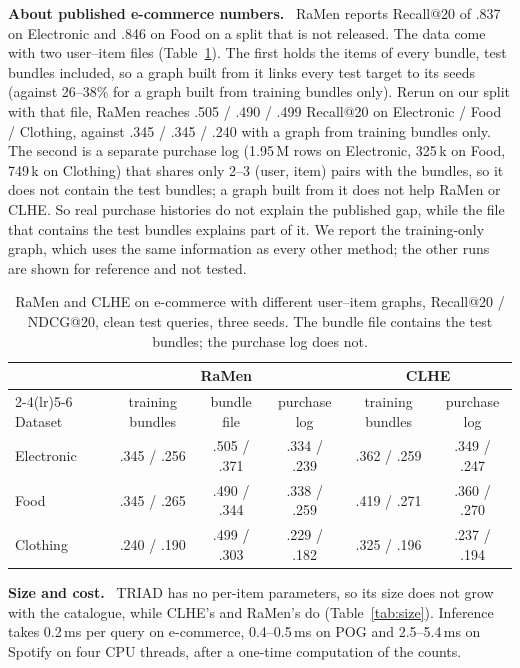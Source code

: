 \documentclass[runningheads]{llncs}
\renewcommand{\paragraph}[1]{\smallskip\noindent\textbf{#1}\ }
\begin{document}
\paragraph{About published e-commerce numbers.} RaMen reports Recall@20 of .837 on Electronic and .846 on Food
\cite{ramen} on a split that is not released. The data come with two user--item files (Table~\ref{tab:uigraph}).
The first holds the items of every bundle, test bundles included, so a graph built from it links every
test target to its seeds (against 26--38\% for a graph built from training bundles only). Rerun on our split with
that file, RaMen reaches .505 / .490 / .499 Recall@20 on Electronic / Food / Clothing, against .345 / .345 / .240
with a graph from training bundles only. The second is a separate purchase log (1.95\,M rows
on Electronic, 325\,k on Food, 749\,k on Clothing) that shares only 2--3 (user, item) pairs with the bundles, so it
does not contain the test bundles; a graph built from it does not help RaMen or CLHE. So real purchase histories do
not explain the published gap, while the file that contains the test bundles explains part of it. We report the training-only graph, which uses
the same information as every other method; the other runs are shown for reference and not tested.

\begin{table}[t]
\centering
\caption{RaMen and CLHE on e-commerce with different user--item graphs, Recall@20 / NDCG@20, clean test queries,
three seeds. The bundle file contains the test bundles; the purchase log does not.}
\label{tab:uigraph}
\setlength{\tabcolsep}{3pt}
\scriptsize
\begin{tabular}{lccccc}
\toprule
& \multicolumn{3}{c}{RaMen} & \multicolumn{2}{c}{CLHE}\\
\cmidrule(lr){2-4}\cmidrule(lr){5-6}
Dataset & training bundles & bundle file & purchase log & training bundles & purchase log\\
\midrule
Electronic & .345 / .256 & .505 / .371 & .334 / .239 & .362 / .259 & .349 / .247\\
Food & .345 / .265 & .490 / .344 & .338 / .259 & .419 / .271 & .360 / .270\\
Clothing & .240 / .190 & .499 / .303 & .229 / .182 & .325 / .196 & .237 / .194\\
\bottomrule
\end{tabular}
\end{table}

\paragraph{Size and cost.} TRIAD has no per-item parameters, so its size does not grow with the catalogue, while
CLHE's and RaMen's do (Table~\ref{tab:size}). Inference takes 0.2\,ms per query on e-commerce, 0.4--0.5\,ms on POG
and 2.5--5.4\,ms on Spotify on four CPU threads, after a one-time computation of the counts.
\end{document}
